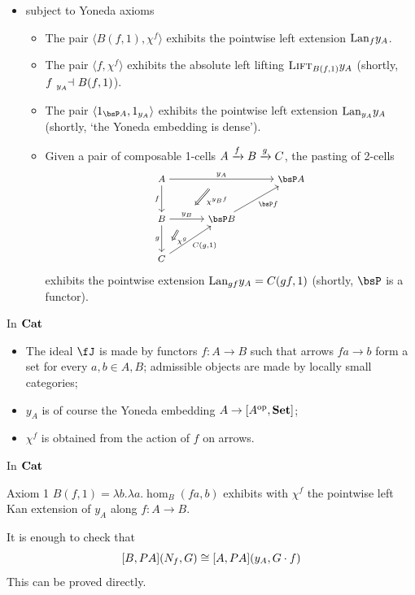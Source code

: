 \documentclass{beamer}
\begin{document}
\begin{frame}
	\begin{itemize}
		\item subject to \alert{Yoneda axioms}
		      \begin{itemize}
			      \item<2->  The pair $\langle B(f,1), \chi^f\rangle$ exhibits the pointwise left extension $\mathrm{Lan}_fy_A$.
			      \item<3->  The pair $\langle f, \chi^f\rangle$ exhibits the absolute left lifting $\textsc{Lift}_{B(f,1)}y_A$ (\alert{shortly, $f\reladjL{y_A} B(f,1)$}).
			      \item<4->  The pair $\langle 1_{\bsP A}, 1_{y_A} \rangle$ exhibits the pointwise left extension $\mathrm{Lan}_{y_A}y_A$ (\alert{shortly, `the Yoneda embedding is dense'}).
			      \item<5->  Given a pair of composable 1-cells $A \xrightarrow{f} B\xrightarrow{g} C$, the
			            pasting of 2-cells
			            $$ \footnotesize \begin{tikzcd}[column sep=large, row sep=large,ampersand replacement=\&] A\ar[d, "f"']\ar[rr, "y_A"{name=yonA}] \&\& \bsP A\\ B \ar[r, "y_B"{name=yonB}]\ar[d, "g"'] \& \bsP B\ar[ur, "\bsP f"']\\ C\ar[ur, "{C(g,1)}"'] \ar[from=yonA, to=yonB, shorten >=2mm, shorten <=4mm, Rightarrow, "\chi^{y_B f}"] \ar[from=yonB, shorten >=4mm, shorten <=4mm, Rightarrow, "\chi^g"] \end{tikzcd} $$
			            exhibits the pointwise extension $\mathrm{Lan}_{gf}y_A = C(gf,1)$ (\alert{shortly, $\bsP$ is a functor}).
		      \end{itemize}
	\end{itemize}
\end{frame}
\begin{frame}{In $\mathbf{Cat}$}
	\begin{itemize}
		\item The ideal $\fJ$ is made by functors $f : A \to B$ such that arrows $fa\to b$ form a set for every $a,b\in A,B$; admissible objects are made by locally small categories;
		\item<2-> $y_A$ is of course the Yoneda embedding $A \to [A^{\text{op}},\mathbf{Set}]$;
		\item<3-> $\chi^f$ is obtained from the action of $f$ on arrows.
	\end{itemize}
\end{frame}
\begin{frame}{In $\mathbf{Cat}$}
	\begin{block}{Axiom 1}
		$B(f,1) = \lambda b.\lambda a.\hom_B(fa,b)$ exhibits with $\chi^f$ the pointwise left Kan extension of $y_A$ along $f : A \to B$.
	\end{block}
	\pause
	It is enough to check that
	\[
		[B,PA](N_f,G) \cong [A,PA](y_A,G\cdot f)
	\]
	This can be proved directly.
\end{frame}
\end{document}
